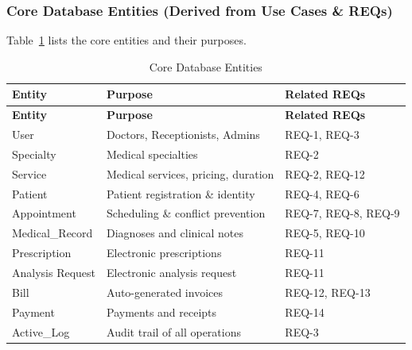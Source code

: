 \subsubsection{Core Database Entities (Derived from Use Cases \& REQs)}
Table~\ref{tab:core-entities} lists the core entities and their purposes.
\begin{longtable}{%
		p{} 
		p{} 
		p{}}
	
	\caption{Core Database Entities}
	\label{tab:core-entities} \\
	
	\toprule
	\textbf{Entity} & \textbf{Purpose} & \textbf{Related REQs} \\
	\midrule
	\endfirsthead
	
	\toprule
	\textbf{Entity} & \textbf{Purpose} & \textbf{Related REQs} \\
	\midrule
	\endhead
	
	User & Doctors, Receptionists, Admins & REQ-1, REQ-3 \\[6pt]
	Specialty & Medical specialties & REQ-2 \\[6pt]
	Service & Medical services, pricing, duration & REQ-2, REQ-12 \\[6pt]
	Patient & Patient registration \& identity & REQ-4, REQ-6 \\[6pt]
	Appointment & Scheduling \& conflict prevention & REQ-7, REQ-8, REQ-9 \\[6pt]
	Medical\_Record & Diagnoses and clinical notes & REQ-5, REQ-10 \\[6pt]
	Prescription & Electronic prescriptions & REQ-11 \\[6pt]
	Analysis Request & Electronic analysis request & REQ-11 \\[6pt]
	Bill & Auto-generated invoices & REQ-12, REQ-13 \\[6pt]
	Payment & Payments and receipts & REQ-14 \\[6pt]
	Active\_Log & Audit trail of all operations & REQ-3 \\
	
	\bottomrule
\end{longtable}
